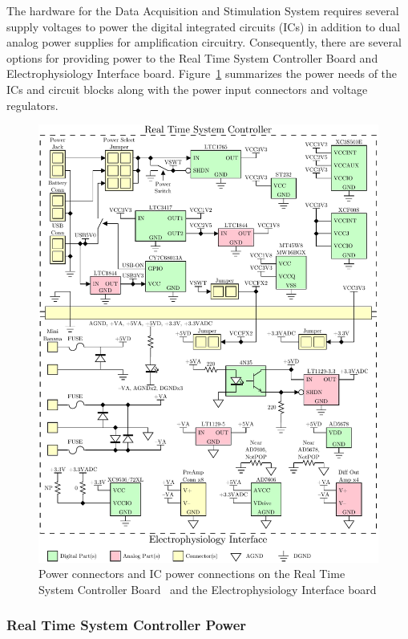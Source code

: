 The hardware for the Data Acquisition and Stimulation System requires several supply voltages to power the digital integrated circuits (ICs) in addition to dual analog power supplies for amplification circuitry.  Consequently, there are several options for providing power to the Real Time System Controller Board and Electrophysiology Interface board.  Figure~\ref{fig:Power} summarizes the power needs of the ICs and circuit blocks along with the power input connectors and voltage regulators.

\begin{figure}[H]
	\begin{singlespace}
	\centering 
		\includegraphics{./figures/Power} 
	\caption{Power connectors and IC power connections on the Real Time System Controller Board~\cite{DigilentNexys2rm,DigilentNexys2sch} and the Electrophysiology Interface board\label{fig:Power}}
	\end{singlespace}
\end{figure}

\subsubsection{Real Time System Controller Power}\label{sec:rtscpower}

